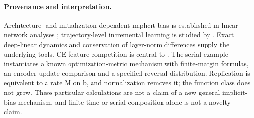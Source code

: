 \paragraph{Provenance and interpretation.}
Architecture- and initialization-dependent implicit bias is established
in linear-network analyses \citep{astra_yun2021,astra_moroshko2020};
trajectory-level incremental learning is studied by
\citet{astra_berthier2023}. Exact deep-linear dynamics
\citep{astra_saxe2014} and conservation of layer-norm differences
\citep{astra_du2018balance} supply the underlying tools. CE feature
competition is central to \citet{pezeshki2021gradient}.
The serial example instantiates a known optimization-metric mechanism
with finite-margin formulas, an encoder-update comparison and a specified
reversal distribution. Replication is equivalent to a rate M on b,
and normalization removes it; the function class does not grow.
These particular calculations are not a claim of a new general implicit-bias
mechanism, and finite-time or serial composition alone is not a novelty claim.

